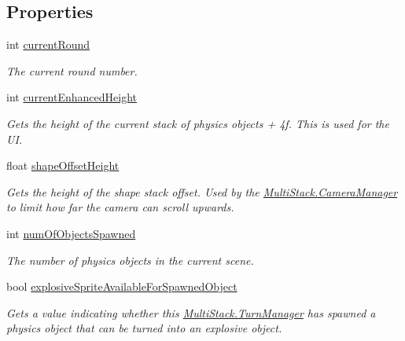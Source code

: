 \subsection*{Properties}
\begin{DoxyCompactItemize}
\item 
int \hyperlink{class_multi_stack_1_1_turn_manager_a74740c372c337673c08f6fe42cd35f5a}{current\+Round}
\begin{DoxyCompactList}\small\item\em The current round number. \end{DoxyCompactList}\item 
int \hyperlink{class_multi_stack_1_1_turn_manager_a02c135523dbabc3d7eef1467e567ec7c}{current\+Enhanced\+Height}
\begin{DoxyCompactList}\small\item\em Gets the height of the current stack of physics objects + 4f. This is used for the U\+I. \end{DoxyCompactList}\item 
float \hyperlink{class_multi_stack_1_1_turn_manager_a951b024c556f17abe670f53ba30089f1}{shape\+Offset\+Height}
\begin{DoxyCompactList}\small\item\em Gets the height of the shape stack offset. Used by the \hyperlink{class_multi_stack_1_1_camera_manager}{Multi\+Stack.\+Camera\+Manager} to limit how far the camera can scroll upwards. \end{DoxyCompactList}\item 
int \hyperlink{class_multi_stack_1_1_turn_manager_a386f4ecd851d1c9ef639ceaf7d31e439}{num\+Of\+Objects\+Spawned}
\begin{DoxyCompactList}\small\item\em The number of physics objects in the current scene. \end{DoxyCompactList}\item 
bool \hyperlink{class_multi_stack_1_1_turn_manager_aa811a8a5c996e0cf99295d7829727874}{explosive\+Sprite\+Available\+For\+Spawned\+Object}
\begin{DoxyCompactList}\small\item\em Gets a value indicating whether this \hyperlink{class_multi_stack_1_1_turn_manager}{Multi\+Stack.\+Turn\+Manager} has spawned a physics object that can be turned into an explosive object. \end{DoxyCompactList}\item 

\end{DoxyCompactItemize}
